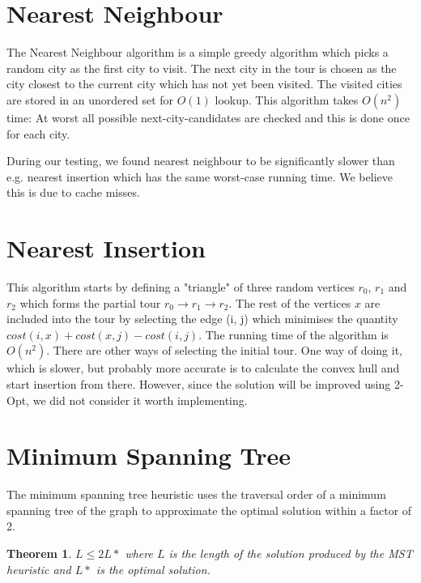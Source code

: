 \documentclass{report}
\newtheorem{theorem}{Theorem}
\begin{document}
\section{Nearest Neighbour}
The Nearest Neighbour algorithm is a simple greedy algorithm which picks a random city as the first city to visit. The next city in the tour is chosen as the city closest to the current city which has not yet been visited. The visited cities are stored in an unordered set for $O(1)$ lookup. This algorithm takes $O(n^2)$ time: At worst all possible next-city-candidates are checked and this is done once for each city.

During our testing, we found nearest neighbour to be significantly slower than e.g. nearest insertion which has the same worst-case running time. We believe this is due to cache misses.

\section{Nearest Insertion}
This algorithm starts by defining a "triangle" of three random vertices $r_0$, $r_1$ and $r_2$ which forms the partial tour $r_0 \rightarrow r_1 \rightarrow r_2$. The rest of the vertices $x$ are included into the tour by selecting the edge (i, j) which minimises the quantity $cost(i, x) + cost(x, j) - cost(i, j)$. The running time of the algorithm is $O(n^2)$. There are other ways of selecting the initial tour. One way of doing it, which is slower, but probably more accurate is to calculate the convex hull and start insertion from there. However, since the solution will be improved using 2-Opt, we did not consider it worth implementing. 


\section{Minimum Spanning Tree}
The minimum spanning tree heuristic uses the traversal order of a minimum spanning tree of the graph to approximate the optimal solution within a factor of 2.

\begin{theorem}
$L \le 2L*$ where $L$ is the length of the solution produced by the MST heuristic and $L*$ is the optimal solution.  
\end{theorem}
\end{document}
